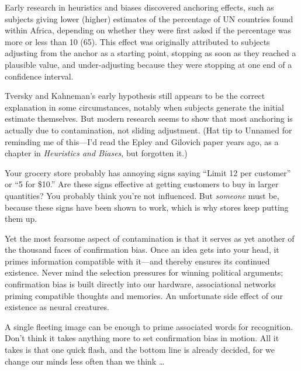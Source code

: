 {
 Early research in heuristics and biases discovered anchoring
effects, such as subjects giving lower (higher) estimates of the
percentage of UN countries found within Africa, depending on whether
they were first asked if the percentage was more or less than 10 (65).
This effect was originally attributed to subjects adjusting from the
anchor as a starting point, stopping as soon as they reached a
plausible value, and under-adjusting because they were stopping at one
end of a confidence interval.}

{
 Tversky and Kahneman's early hypothesis still
appears to be the correct explanation in some circumstances, notably
when subjects generate the initial estimate
themselves. But modern research seems to show that
most anchoring is actually due to contamination, not sliding
adjustment. (Hat tip to Unnamed for reminding me of
this---I'd read the Epley and Gilovich paper years ago,
as a chapter in \textit{Heuristics and Biases}, but forgotten it.)}

{
 Your grocery store probably has annoying signs saying
``Limit 12 per customer'' or
``5 for \$10.'' Are these signs
effective at getting customers to buy in larger quantities? You
probably think you're not influenced. But
\textit{someone} must be, because these signs have been shown to work,
which is why stores keep putting them up.}

{
 Yet the most fearsome aspect of contamination is that it serves as
yet another of the thousand faces of confirmation bias. Once an idea
gets into your head, it primes information compatible with it---and
thereby ensures its continued existence. Never mind the selection
pressures for winning political arguments; confirmation bias is built
directly into our hardware, associational networks priming compatible
thoughts and memories. An unfortunate side effect of our existence as
neural creatures.}

{
 A single fleeting image can be enough to prime associated words
for recognition. Don't think it takes anything more to
set confirmation bias in motion. All it takes is that one quick flash,
and the bottom line is already decided, for we change our minds less
often than we think \ldots}

